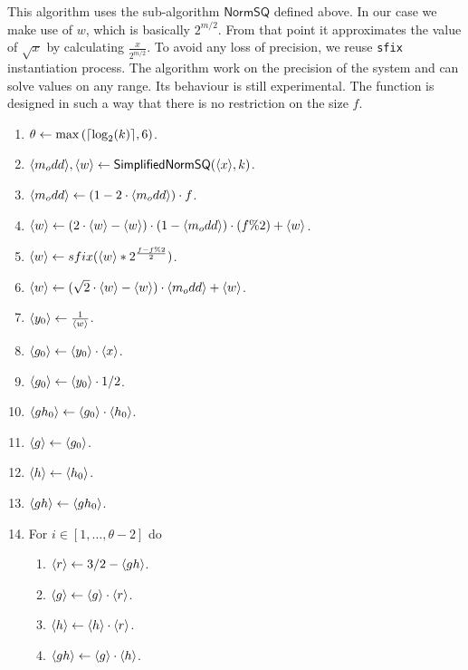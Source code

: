 This algorithm uses the sub-algorithm $\mathsf{NormSQ}$ defined above. In our case we make use of $w$, which is basically  $2^{m/2}$. From that point it approximates the  value of $\sqrt{x}$ by calculating $\frac{x}{2^{m/2}}$. To avoid any loss of precision, we reuse \verb|sfix| instantiation process.
The algorithm work on the precision of the system and can solve values on any range. Its behaviour is still experimental. The function is designed in such a way that there is no restriction on the size $f$.
\begin{enumerate}
\item $\theta \leftarrow \max{({\lceil \log_2(k) \rceil},6)}$.
\item $\langle m_odd \rangle, \langle w \rangle \leftarrow \mathsf{SimplifiedNormSQ}(\langle x \rangle,k)$.
\item $\langle m_odd \rangle \leftarrow (1 - 2 \cdot \langle m_odd \rangle) \cdot f$.   
 \item $\langle w \rangle \leftarrow (2 \cdot \langle w \rangle -\langle w \rangle) \cdot (1 - \langle m_odd \rangle) \cdot (f \% 2) + \langle w \rangle$.
\item $\langle w \rangle \leftarrow sfix( \langle w \rangle * 2 ^{\frac{f - f \% 2}{2}})$.
\item $\langle w \rangle \leftarrow (\sqrt{2}\cdot \langle w \rangle - \langle w \rangle)\cdot \langle m_odd \rangle + \langle w \rangle$.
\item $\langle y_0 \rangle \leftarrow \frac{1}{\langle w \rangle} $.
\item $\langle g_0 \rangle \leftarrow \langle y_0 \rangle \cdot \langle x \rangle$.
\item $\langle g_0 \rangle \leftarrow \langle y_0 \rangle \cdot 1/2$.
\item $\langle gh_0 \rangle \leftarrow \langle g_0 \rangle \cdot \langle h_0 \rangle$.
\item $\langle g \rangle \leftarrow \langle g_0 \rangle$.
\item $\langle h \rangle \leftarrow \langle h_0 \rangle$.
\item $\langle gh \rangle \leftarrow \langle gh_0 \rangle$.
\item For $i \in[1,\ldots,\theta-2]$ do
\begin{enumerate}
  \item $\langle r \rangle \leftarrow 3/2-\langle gh \rangle$.
  \item $\langle g \rangle \leftarrow \langle g \rangle \cdot \langle r \rangle$.
  \item $\langle h \rangle \leftarrow \langle h \rangle \cdot \langle r \rangle$.
  \item $\langle gh \rangle \leftarrow \langle g \rangle \cdot \langle h \rangle$.

\end{enumerate}
\end{enumerate}

